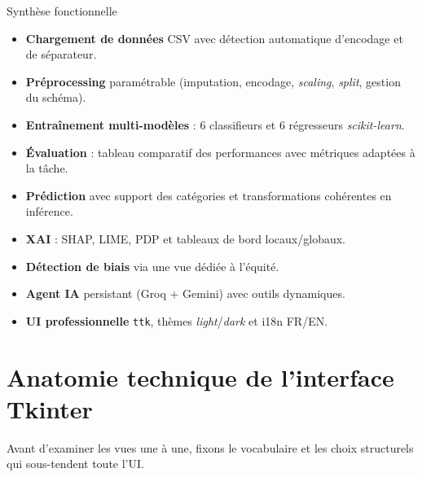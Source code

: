 \documentclass[11pt,a4paper]{report}
\begin{document}
\begin{infobox}{Synth\`ese fonctionnelle}
\begin{itemize}
    \item \textbf{Chargement de donn\'ees} CSV avec d\'etection automatique d'encodage et de s\'eparateur.
    \item \textbf{Pr\'eprocessing} param\'etrable (imputation, encodage, \textit{scaling}, \textit{split}, gestion du sch\'ema).
    \item \textbf{Entra\^inement multi-mod\`eles} : 6 classifieurs et 6 r\'egresseurs \textit{scikit-learn}.
    \item \textbf{\'Evaluation} : tableau comparatif des performances avec m\'etriques adapt\'ees \`a la t\^ache.
    \item \textbf{Pr\'ediction} avec support des cat\'egories et transformations coh\'erentes en inf\'erence.
    \item \textbf{XAI} : SHAP, LIME, PDP et tableaux de bord locaux/globaux.
    \item \textbf{D\'etection de biais} via une vue d\'edi\'ee \`a l'\'equit\'e.
    \item \textbf{Agent IA} persistant (Groq + Gemini) avec outils dynamiques.
    \item \textbf{UI professionnelle} \texttt{ttk}, th\`emes \textit{light}/\textit{dark} et i18n FR/EN.
\end{itemize}
\end{infobox}

\section{Anatomie technique de l'interface Tkinter}

Avant d'examiner les vues une \`a une, fixons le vocabulaire et les
choix structurels qui sous-tendent toute l'UI.
\end{document}

